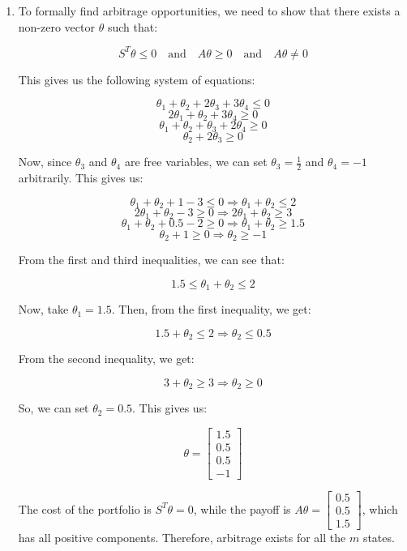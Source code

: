 \documentclass[a4paper]{article}
\begin{document}
\begin{enumerate}[label=(\alph*)]
    \vspace{10mm}

    \item To formally find arbitrage opportunities, we need to show that there exists a non-zero vector $\theta$ such that:

    \[ S^{T}\theta \leq 0 \quad \text{and} \quad A\theta \geq 0 \quad \text{and} \quad A\theta \neq 0 \]

    This gives us the following system of equations:

    \[ \theta_{1} + \theta_{2} + 2\theta_{3} + 3\theta_{4} \leq 0 \]
    \[ 2\theta_{1} + \theta_{2} + 3\theta_{4} \geq 0 \]
    \[ \theta_{1} + \theta_{2} + \theta_{3} + 2\theta_{4} \geq 0 \]
    \[ \theta_{2} + 2\theta_{3} \geq 0 \]

    Now, since $\theta_{3}$ and $\theta_{4}$ are free variables, we can set $\theta_{3} = \frac{1}{2}$ and $\theta_{4} = -1$ arbitrarily. This gives us:

    \[ \theta_{1} + \theta_{2} + 1 - 3 \leq 0 \Rightarrow \theta_{1} + \theta_{2} \leq 2 \]
    \[ 2\theta_{1} + \theta_{2} - 3 \geq 0 \Rightarrow 2\theta_{1} + \theta_{2} \geq 3 \]
    \[ \theta_{1} + \theta_{2} + 0.5 - 2 \geq 0 \Rightarrow \theta_{1} + \theta_{2} \geq 1.5 \]
    \[ \theta_{2} + 1 \geq 0 \Rightarrow \theta_{2} \geq -1 \]

    From the first and third inequalities, we can see that:

    \[ 1.5 \leq \theta_{1} + \theta_{2} \leq 2 \]

    Now, take $\theta_{1} = 1.5$. Then, from the first inequality, we get:

    \[ 1.5 + \theta_{2} \leq 2 \Rightarrow \theta_{2} \leq 0.5 \]

    From the second inequality, we get:

    \[ 3 + \theta_{2} \geq 3 \Rightarrow \theta_{2} \geq 0 \]

    So, we can set $\theta_{2} = 0.5$. This gives us:

    \[ \theta = \begin{bmatrix} 1.5 \\ 0.5 \\ 0.5 \\ -1 \end{bmatrix} \]

    The cost of the portfolio is $S^{T}\theta = 0$, while the payoff is $A\theta = \begin{bmatrix} 0.5 \\ 0.5 \\ 1.5 \end{bmatrix}$, which has all positive components. Therefore, arbitrage exists for all the $m$ states.



\end{enumerate}
\end{document}
